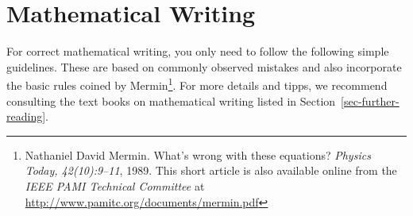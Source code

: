 \documentclass[11pt,a4paper]{article}
\begin{document}
\newpage
\section{Mathematical Writing}
\label{sec-mathematics}

For correct mathematical writing, you only need to follow the following simple guidelines.
These are based on commonly observed mistakes and also incorporate the basic rules coined by Mermin\footnote{Nathaniel David Mermin. What's wrong with these equations? \emph{Physics Today, 42(10):9--11}, 1989. This short article is also available online from the \emph{IEEE PAMI Technical Committee} at \url{http://www.pamitc.org/documents/mermin.pdf}}.
For more details and tipps, we recommend consulting the text books on mathematical writing listed in Section~\ref{sec-further-reading}.
\end{document}
